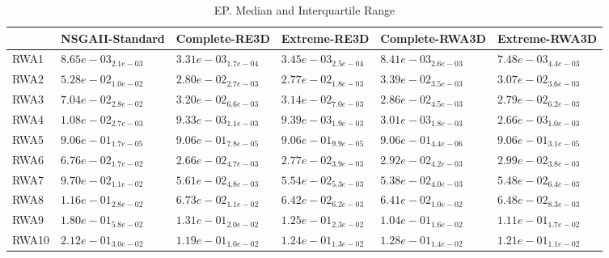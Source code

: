 \documentclass{article}
\begin{document}
\begin{table}
\caption{EP. Median and Interquartile Range}
\label{table: EP}
\centering
\begin{scriptsize}
\begin{tabular}{llllll}
\hline & NSGAII-Standard & Complete-RE3D & Extreme-RE3D & Complete-RWA3D &  Extreme-RWA3D\\
\hline 
RWA1 & $  8.65e-03_{ 2.1e-03}$ & \cellcolor{gray95}$  3.31e-03_{ 1.7e-04}$ & \cellcolor{gray25}$  3.45e-03_{ 2.5e-04}$ & $  8.41e-03_{ 2.6e-03}$ & $  7.48e-03_{ 4.4e-03}$ \\
RWA2 & $  5.28e-02_{ 1.0e-02}$ & \cellcolor{gray25}$  2.80e-02_{ 2.7e-03}$ & \cellcolor{gray95}$  2.77e-02_{ 1.8e-03}$ & $  3.39e-02_{ 3.5e-03}$ & $  3.07e-02_{ 3.6e-03}$ \\
RWA3 & $  7.04e-02_{ 2.8e-02}$ & $  3.20e-02_{ 6.6e-03}$ & $  3.14e-02_{ 7.0e-03}$ & \cellcolor{gray25}$  2.86e-02_{ 4.5e-03}$ & \cellcolor{gray95}$  2.79e-02_{ 6.2e-03}$ \\
RWA4 & $  1.08e-02_{ 2.7e-03}$ & $  9.33e-03_{ 1.1e-03}$ & $  9.39e-03_{ 1.9e-03}$ & \cellcolor{gray25}$  3.01e-03_{ 1.8e-03}$ & \cellcolor{gray95}$  2.66e-03_{ 1.0e-03}$ \\
RWA5 & $  9.06e-01_{ 1.7e-05}$ & $  9.06e-01_{ 7.8e-05}$ & $  9.06e-01_{ 9.9e-05}$ & \cellcolor{gray95}$  9.06e-01_{ 4.4e-06}$ & \cellcolor{gray25}$  9.06e-01_{ 3.1e-05}$ \\
RWA6 & $  6.76e-02_{ 1.7e-02}$ & \cellcolor{gray95}$  2.66e-02_{ 4.7e-03}$ & \cellcolor{gray25}$  2.77e-02_{ 3.9e-03}$ & $  2.92e-02_{ 4.2e-03}$ & $  2.99e-02_{ 3.8e-03}$ \\
RWA7 & $  9.70e-02_{ 1.1e-02}$ & $  5.61e-02_{ 4.8e-03}$ & $  5.54e-02_{ 5.3e-03}$ & \cellcolor{gray95}$  5.38e-02_{ 4.0e-03}$ & \cellcolor{gray25}$  5.48e-02_{ 6.4e-03}$ \\
RWA8 & $  1.16e-01_{ 2.8e-02}$ & $  6.73e-02_{ 1.1e-02}$ & \cellcolor{gray25}$  6.42e-02_{ 6.2e-03}$ & \cellcolor{gray95}$  6.41e-02_{ 1.0e-02}$ & $  6.48e-02_{ 8.3e-03}$ \\
RWA9 & $  1.80e-01_{ 5.8e-02}$ & $  1.31e-01_{ 2.0e-02}$ & $  1.25e-01_{ 2.3e-02}$ & \cellcolor{gray95}$  1.04e-01_{ 1.6e-02}$ & \cellcolor{gray25}$  1.11e-01_{ 1.7e-02}$ \\
RWA10 & $  2.12e-01_{ 3.0e-02}$ & \cellcolor{gray95}$  1.19e-01_{ 1.0e-02}$ & $  1.24e-01_{ 1.3e-02}$ & $  1.28e-01_{ 1.4e-02}$ & \cellcolor{gray25}$  1.21e-01_{ 1.1e-02}$ \\
\hline
\end{tabular}
\end{scriptsize}
\end{table}
\end{document}

